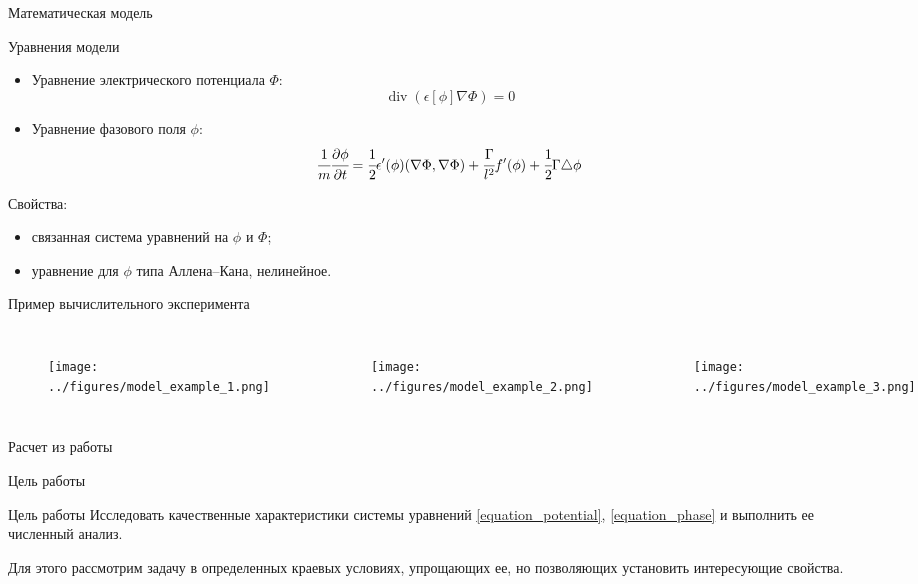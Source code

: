 \documentclass[aspectratio=169]{beamer}
\DeclareMathOperator{\Div}{div}
\begin{document}
\begin{frame}{Математическая модель}
\vspace{-0.5cm}
\begin{block}{Уравнения модели}
\begin{itemize}
	\item Уравнение электрического потенциала $\Phi$:
	\begin{equation}
		\Div(\epsilon[\phi] \nabla \Phi) = 0
		\label{equation_potential}
	\end{equation}
	\item Уравнение фазового поля $\phi$:
	\begin{equation}
		\cfrac{1}{m} \cfrac{\partial \phi}{\partial t} = \cfrac{1}{2} \epsilon'(\phi)
		(\nabla \Phi, \nabla \Phi) + \cfrac{\Gamma}{l^2} f'(\phi) +
		\cfrac{1}{2} \Gamma \triangle \phi
		\label{equation_phase}
	\end{equation}
\end{itemize}
\end{block}
Свойства:
\begin{itemize}
	\item связанная система уравнений на $\phi$ и $\Phi$;
	\item уравнение для $\phi$ типа Аллена--Кана, нелинейное.
\end{itemize}
\end{frame}


\begin{frame}{Пример вычислительного эксперимента}
\begin{columns}
\begin{figure}
	\texttt{[image: ../figures/model\_example\_1.png]}
\end{figure}
\begin{figure}
	\texttt{[image: ../figures/model\_example\_2.png]}
\end{figure}
\begin{figure}
	\texttt{[image: ../figures/model\_example\_3.png]}
\end{figure}
\end{columns}
\begin{center}
	Расчет из работы \cite{zipunova_experiment}
\end{center}
\end{frame}


\begin{frame}{Цель работы}
\begin{block}{Цель работы}
	Исследовать качественные характеристики системы уравнений \eqref{equation_potential},
	\eqref{equation_phase} и выполнить ее численный анализ.
\end{block}
Для этого рассмотрим задачу в определенных краевых условиях, упрощающих ее, но позволяющих
установить интересующие свойства.
\end{frame}
\end{document}
